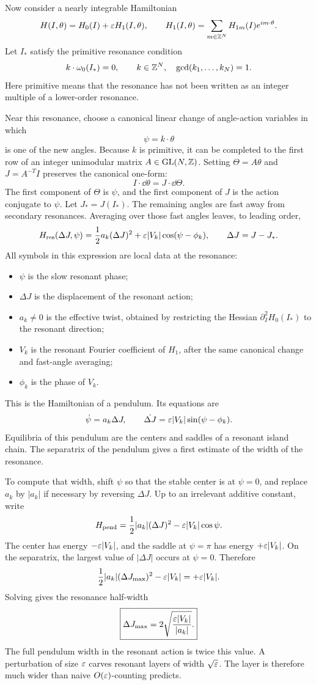 Now consider a nearly integrable Hamiltonian
\[
  H(I,\theta)=H_0(I)+\varepsilon H_1(I,\theta),
  \qquad
  H_1(I,\theta)=\sum_{m\in\mathbb{Z}^N}H_{1m}(I)e^{im\cdot\theta}.
\]
Let \(I_*\) satisfy the primitive resonance condition
\[
  k\cdot\omega_0(I_*)=0,
  \qquad
  k\in\mathbb{Z}^N,\quad \gcd(k_1,\ldots,k_N)=1.
\]
Here primitive means that the resonance has not been written as an integer
multiple of a lower-order resonance.

Near this resonance, choose a canonical linear change of angle-action
variables in which
\[
  \psi=k\cdot\theta
\]
is one of the new angles. Because \(k\) is primitive, it can be completed to
the first row of an integer unimodular matrix \(A\in\mathrm{GL}(N,\mathbb{Z})\). Setting
\(\Theta=A\theta\) and \(J=A^{-T}I\) preserves the canonical one-form:
\[
  I\cdot\dd\theta=J\cdot\dd\Theta.
\]
The first component of \(\Theta\) is \(\psi\), and the first component of
\(J\) is the action conjugate to \(\psi\). Let \(J_*=J(I_*)\). The remaining angles are fast away from secondary
resonances. Averaging over those fast angles leaves, to leading order,
\[
  H_{\mathrm{res}}(\Delta J,\psi)
  =
  \frac12 a_k(\Delta J)^2
  +
  \varepsilon |V_k|\cos(\psi-\phi_k),
  \qquad
  \Delta J=J-J_*.
\]
All symbols in this expression are local data at the resonance:
\begin{itemize}
\item \(\psi\) is the slow resonant phase;
\item \(\Delta J\) is the displacement of the resonant action;
\item \(a_k\neq0\) is the effective twist, obtained by restricting the Hessian
\(\partial_I^2H_0(I_*)\) to the resonant direction;
\item \(V_k\) is the resonant Fourier coefficient of \(H_1\), after the same
canonical change and fast-angle averaging;
\item \(\phi_k\) is the phase of \(V_k\).
\end{itemize}

This is the Hamiltonian of a pendulum. Its equations are
\[
  \dot\psi=a_k\Delta J,
  \qquad
  \dot{\Delta J}
  =
  \varepsilon |V_k|\sin(\psi-\phi_k).
\]
Equilibria of this pendulum are the centers and saddles of a resonant island
chain. The separatrix of the pendulum gives a first estimate of the width of
the resonance.

To compute that width, shift \(\psi\) so that the stable center is at
\(\psi=0\), and replace \(a_k\) by \(|a_k|\) if necessary by reversing
\(\Delta J\). Up to an irrelevant additive constant, write
\[
  H_{\mathrm{pend}}
  =
  \frac12 |a_k|(\Delta J)^2
  -
  \varepsilon |V_k|\cos\psi .
\]
The center has energy \(-\varepsilon |V_k|\), and the saddle at \(\psi=\pi\) has
energy \(+\varepsilon |V_k|\). On the separatrix, the largest value of
\(|\Delta J|\) occurs at \(\psi=0\). Therefore
\[
  \frac12 |a_k|(\Delta J_{\max})^2-\varepsilon |V_k|
  =
  +\varepsilon |V_k|.
\]
Solving gives the resonance half-width
\[
  \boxed{
  \Delta J_{\max}
  =
  2\sqrt{\frac{\varepsilon |V_k|}{|a_k|}}.
  }
\]
The full pendulum width in the resonant action is twice this value. A
perturbation of size \(\varepsilon\) carves resonant layers of width
\(\sqrt{\varepsilon}\). The layer is therefore much wider than naive
\(O(\varepsilon)\)-counting predicts.

